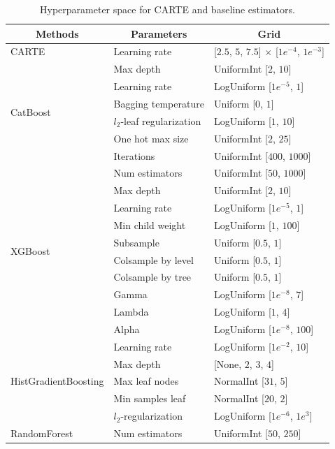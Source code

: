 \documentclass{article}
\theoremstyle{plain}
\theoremstyle{definition}
\theoremstyle{remark}
\begin{document}
\begin{table}[!h]
\small
\begin{center}
\caption{Hyperparameter space for CARTE and baseline estimators.}
\label{tab:hyperparmeter_space}
\vspace{0.1in}
\begin{tabular}{lll}
\toprule
\multicolumn{1}{c}{\textbf{Methods}} & \multicolumn{1}{c}{\textbf{Parameters}} & \multicolumn{1}{c}{\textbf{Grid}} \\
\midrule
CARTE & Learning rate & [$2.5$, $5$, $7.5$] $\times$ [$1e^{-4}$, $1e^{-3}$] \\
\midrule
\multirow{6}{*}{CatBoost} & Max depth & UniformInt [$2$, $10$] \\
& Learning rate & LogUniform [$1e^{-5}$, $1$]\\
& Bagging temperature & Uniform [$0$, $1$]\\
& $l_{2}$-leaf regularization & LogUniform [$1$, $10$]\\
& One hot max size & UniformInt [$2$, $25$]\\
& Iterations & UniformInt [$400$, $1000$]\\
\hline
\multirow{10}{*}{XGBoost} & Num estimators & UniformInt [$50$, $1000$] \\
& Max depth & UniformInt [$2$, $10$]\\
& Learning rate & LogUniform [$1e^{-5}$, $1$]\\
& Min child weight & LogUniform [$1$, $100$]\\
& Subsample & Uniform [$0.5$, $1$]\\
& Colsample by level & Uniform [$0.5$, $1$]\\
& Colsample by tree & Uniform [$0.5$, $1$]\\
& Gamma & LogUniform [$1e^{-8}$, $7$]\\
& Lambda & LogUniform [$1$, $4$]\\
& Alpha & LogUniform [$1e^{-8}$, $100$]\\ 
\midrule
\multirow{5}{*}{HistGradientBoosting} & Learning rate & LogUniform [$1e^{-2}$, $10$] \\
& Max depth & [None, $2$, $3$, $4$]\\
& Max leaf nodes & NormalInt [$31$, $5$]\\
& Min samples leaf & NormalInt [$20$, $2$]\\
& $l_2$-regularization & LogUniform [$1e^{-6}$, $1e^{3}$]\\
\midrule
\multirow{6}{*}{RandomForest} & Num estimators & UniformInt [$50$, $250$] \\

\end{tabular}
\end{center}
\end{table}
\end{document}
